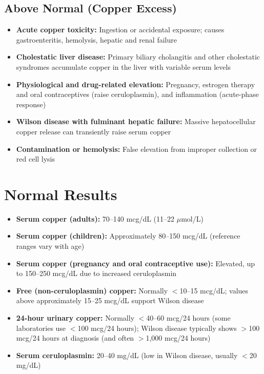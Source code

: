 \subsection*{Above Normal (Copper Excess)}
\begin{itemize}
  \item \textbf{Acute copper toxicity:} Ingestion or accidental exposure; causes gastroenteritis, hemolysis, hepatic and renal failure
  \item \textbf{Cholestatic liver disease:} Primary biliary cholangitis and other cholestatic syndromes accumulate copper in the liver with variable serum levels
  \item \textbf{Physiological and drug-related elevation:} Pregnancy, estrogen therapy and oral contraceptives (raise ceruloplasmin), and inflammation (acute-phase response)
  \item \textbf{Wilson disease with fulminant hepatic failure:} Massive hepatocellular copper release can transiently raise serum copper
  \item \textbf{Contamination or hemolysis:} False elevation from improper collection or red cell lysis
\end{itemize}

\section*{Normal Results}
\begin{itemize}
  \item \textbf{Serum copper (adults):} 70--140 mcg/dL (11--22 $\mu$mol/L)
  \item \textbf{Serum copper (children):} Approximately 80--150 mcg/dL (reference ranges vary with age)
  \item \textbf{Serum copper (pregnancy and oral contraceptive use):} Elevated, up to 150--250 mcg/dL due to increased ceruloplasmin
  \item \textbf{Free (non-ceruloplasmin) copper:} Normally $<$10--15 mcg/dL; values above approximately 15--25 mcg/dL support Wilson disease
  \item \textbf{24-hour urinary copper:} Normally $<$40--60 mcg/24 hours (some laboratories use $<$100 mcg/24 hours); Wilson disease typically shows $>$100 mcg/24 hours at diagnosis (and often $>$1,000 mcg/24 hours)
  \item \textbf{Serum ceruloplasmin:} 20--40 mg/dL (low in Wilson disease, usually $<$20 mg/dL)
\end{itemize}


